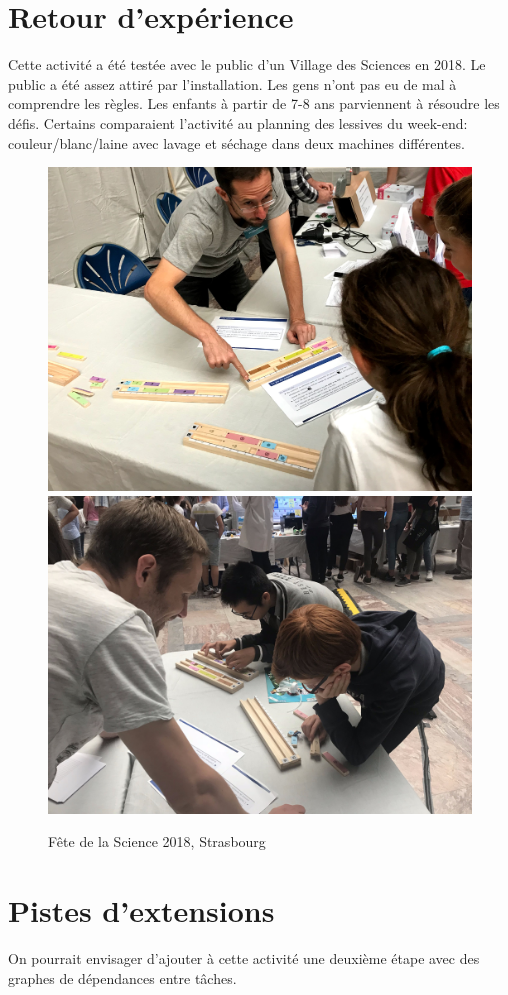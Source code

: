 \documentclass[a4paper]{article}
\begin{document}
\section{Retour d'expérience}

Cette activité a été testée avec le public d'un Village des Sciences en 2018. Le public a été assez attiré par l'installation. Les gens n'ont pas eu de mal à comprendre les règles. Les enfants à partir de 7-8 ans parviennent à résoudre les défis. Certains comparaient l'activité au planning des lessives du week-end: couleur/blanc/laine avec lavage et séchage dans deux machines différentes. 

\begin{figure}[h!]
\includegraphics[width=\textwidth]{photo_activite.jpg}\\
\includegraphics[width=\textwidth]{photo_activite2.jpg}

\caption{Fête de la Science 2018, Strasbourg}
\end{figure}

\section{Pistes d'extensions}

On pourrait envisager d'ajouter à cette activité une deuxième étape avec des graphes de dépendances entre tâches.







\clearpage

 

\end{document}
